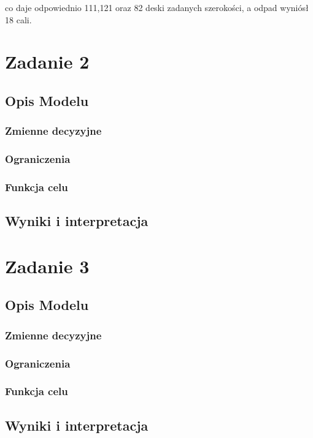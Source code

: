 \documentclass{article}
\begin{document}
co daje odpowiednio 111,121 oraz 82 deski zadanych szerokości, a odpad wyniósł 18 cali.

\section{Zadanie 2}
\subsection{Opis Modelu}

\subsubsection{Zmienne decyzyjne}

\subsubsection{Ograniczenia}

\subsubsection{Funkcja celu}

\subsection{Wyniki i interpretacja}

\section{Zadanie 3}
\subsection{Opis Modelu}

\subsubsection{Zmienne decyzyjne}

\subsubsection{Ograniczenia}

\subsubsection{Funkcja celu}

\subsection{Wyniki i interpretacja}
\end{document}

